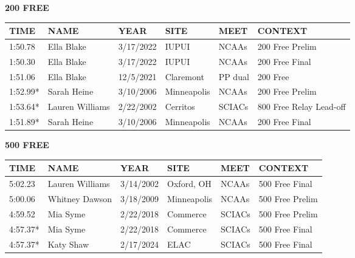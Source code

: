 \begin{minipage}[t]{0.48\textwidth}
\centering
\textbf{200 FREE}\\[0.05cm]
\begin{tabular}{@{}p{1.8cm}p{2.8cm}p{1.2cm}p{1.4cm}p{1.4cm}p{2.0cm}@{}}
\hline
\textbf{TIME} & \textbf{NAME} & \textbf{YEAR} & \textbf{SITE} & \textbf{MEET} & \textbf{CONTEXT} \\
\hline
1:50.78 & Ella Blake & 3/17/2022 & IUPUI & NCAAs & 200 Free Prelim \\
1:50.30 & Ella Blake & 3/17/2022 & IUPUI & NCAAs & 200 Free Final \\
1:51.06 & Ella Blake & 12/5/2021 & Claremont & PP dual & 200 Free \\
1:52.99* & Sarah Heine & 3/10/2006 & Minneapolis & NCAAs & 200 Free Prelim \\
1:53.64* & Lauren Williams & 2/22/2002 & Cerritos & SCIACs & 800 Free Relay Lead-off \\
1:51.89* & Sarah Heine & 3/10/2006 & Minneapolis & NCAAs & 200 Free Final \\
\hline
\end{tabular}
\end{minipage}\hfill
\begin{minipage}[t]{0.48\textwidth}
\centering
\textbf{500 FREE}\\[0.05cm]
\begin{tabular}{@{}p{1.8cm}p{2.8cm}p{1.2cm}p{1.4cm}p{1.4cm}p{2.0cm}@{}}
\hline
\textbf{TIME} & \textbf{NAME} & \textbf{YEAR} & \textbf{SITE} & \textbf{MEET} & \textbf{CONTEXT} \\
\hline
5:02.23 & Lauren Williams & 3/14/2002 & Oxford, OH & NCAAs & 500 Free Final \\
5:00.06 & Whitney Dawson & 3/18/2009 & Minneapolis & NCAAs & 500 Free Prelim \\
4:59.52 & Mia Syme & 2/22/2018 & Commerce & SCIACs & 500 Free Prelim \\
4:57.37* & Mia Syme & 2/22/2018 & Commerce & SCIACs & 500 Free Final \\
4:57.37* & Katy Shaw & 2/17/2024 & ELAC & SCIACs & 500 Free Final \\
\hline
\end{tabular}
\end{minipage}

\vspace{0.4cm}

